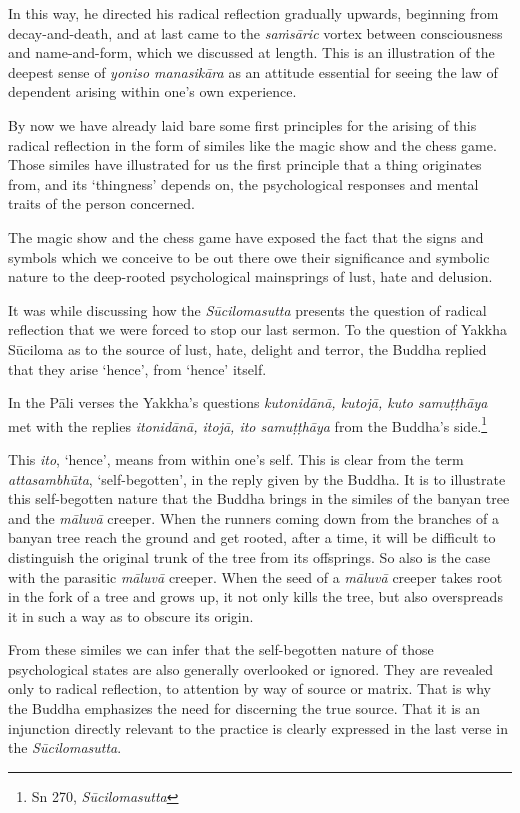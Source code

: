 In this way, he directed his radical reflection gradually upwards, beginning from decay-and-death, and at last came to the \emph{saṁsāric} vortex between consciousness and name-and-form, which we discussed at length. This is an illustration of the deepest sense of \emph{yoniso manasikāra} as an attitude essential for seeing the law of dependent arising within one's own experience.

By now we have already laid bare some first principles for the arising of this radical reflection in the form of similes like the magic show and the chess game. Those similes have illustrated for us the first principle that a thing originates from, and its `thingness' depends on, the psychological responses and mental traits of the person concerned.

The magic show and the chess game have exposed the fact that the signs and symbols which we conceive to be out there owe their significance and symbolic nature to the deep-rooted psychological mainsprings of lust, hate and delusion.

It was while discussing how the \emph{Sūcilomasutta} presents the question of radical reflection that we were forced to stop our last sermon. To the question of Yakkha Sūciloma as to the source of lust, hate, delight and terror, the Buddha replied that they arise `hence', from `hence' itself.

In the Pāli verses the Yakkha's questions \emph{kutonidānā, kutojā, kuto samuṭṭhāya} met with the replies \emph{itonidānā, itojā, ito samuṭṭhāya} from the Buddha's side.\footnote{Sn 270, \emph{Sūcilomasutta}}

This \emph{ito}, `hence', means from within one's self. This is clear from the term \emph{attasambhūta}, `self-begotten', in the reply given by the Buddha. It is to illustrate this self-begotten nature that the Buddha brings in the similes of the banyan tree and the \emph{māluvā} creeper. When the runners coming down from the branches of a banyan tree reach the ground and get rooted, after a time, it will be difficult to distinguish the original trunk of the tree from its offsprings. So also is the case with the parasitic \emph{māluvā} creeper. When the seed of a \emph{māluvā} creeper takes root in the fork of a tree and grows up, it not only kills the tree, but also overspreads it in such a way as to obscure its origin.

From these similes we can infer that the self-begotten nature of those psychological states are also generally overlooked or ignored. They are revealed only to radical reflection, to attention by way of source or matrix. That is why the Buddha emphasizes the need for discerning the true source. That it is an injunction directly relevant to the practice is clearly expressed in the last verse in the \emph{Sūcilomasutta}.

